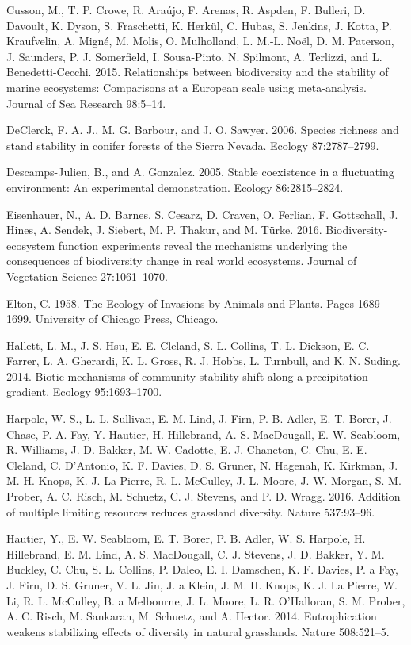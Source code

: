 \documentclass[12pt,]{article}
\begin{document}
Cusson, M., T. P. Crowe, R. Ara{ú}jo, F. Arenas, R. Aspden, F. Bulleri,
D. Davoult, K. Dyson, S. Fraschetti, K. Herk{ü}l, C. Hubas, S. Jenkins,
J. Kotta, P. Kraufvelin, A. Mign{é}, M. Molis, O. Mulholland, L. M.-L.
No{ë}l, D. M. Paterson, J. Saunders, P. J. Somerfield, I. Sousa-Pinto,
N. Spilmont, A. Terlizzi, and L. Benedetti-Cecchi. 2015. Relationships
between biodiversity and the stability of marine ecosystems: Comparisons
at a European scale using meta-analysis. Journal of Sea Research
98:5--14.

DeClerck, F. A. J., M. G. Barbour, and J. O. Sawyer. 2006. Species
richness and stand stability in conifer forests of the Sierra Nevada.
Ecology 87:2787--2799.

Descamps-Julien, B., and A. Gonzalez. 2005. Stable coexistence in a
fluctuating environment: An experimental demonstration. Ecology
86:2815--2824.

Eisenhauer, N., A. D. Barnes, S. Cesarz, D. Craven, O. Ferlian, F.
Gottschall, J. Hines, A. Sendek, J. Siebert, M. P. Thakur, and M.
T{ü}rke. 2016. Biodiversity-ecosystem function experiments reveal the
mechanisms underlying the consequences of biodiversity change in real
world ecosystems. Journal of Vegetation Science 27:1061--1070.

Elton, C. 1958. The Ecology of Invasions by Animals and Plants. Pages
1689--1699. University of Chicago Press, Chicago.

Hallett, L. M., J. S. Hsu, E. E. Cleland, S. L. Collins, T. L. Dickson,
E. C. Farrer, L. A. Gherardi, K. L. Gross, R. J. Hobbs, L. Turnbull, and
K. N. Suding. 2014. Biotic mechanisms of community stability shift along
a precipitation gradient. Ecology 95:1693--1700.

Harpole, W. S., L. L. Sullivan, E. M. Lind, J. Firn, P. B. Adler, E. T.
Borer, J. Chase, P. A. Fay, Y. Hautier, H. Hillebrand, A. S. MacDougall,
E. W. Seabloom, R. Williams, J. D. Bakker, M. W. Cadotte, E. J.
Chaneton, C. Chu, E. E. Cleland, C. D'Antonio, K. F. Davies, D. S.
Gruner, N. Hagenah, K. Kirkman, J. M. H. Knops, K. J. {La Pierre}, R. L.
McCulley, J. L. Moore, J. W. Morgan, S. M. Prober, A. C. Risch, M.
Schuetz, C. J. Stevens, and P. D. Wragg. 2016. Addition of multiple
limiting resources reduces grassland diversity. Nature 537:93--96.

Hautier, Y., E. W. Seabloom, E. T. Borer, P. B. Adler, W. S. Harpole, H.
Hillebrand, E. M. Lind, A. S. MacDougall, C. J. Stevens, J. D. Bakker,
Y. M. Buckley, C. Chu, S. L. Collins, P. Daleo, E. I. Damschen, K. F.
Davies, P. a Fay, J. Firn, D. S. Gruner, V. L. Jin, J. a Klein, J. M. H.
Knops, K. J. {La Pierre}, W. Li, R. L. McCulley, B. a Melbourne, J. L.
Moore, L. R. O'Halloran, S. M. Prober, A. C. Risch, M. Sankaran, M.
Schuetz, and A. Hector. 2014. Eutrophication weakens stabilizing effects
of diversity in natural grasslands. Nature 508:521--5.
\end{document}
